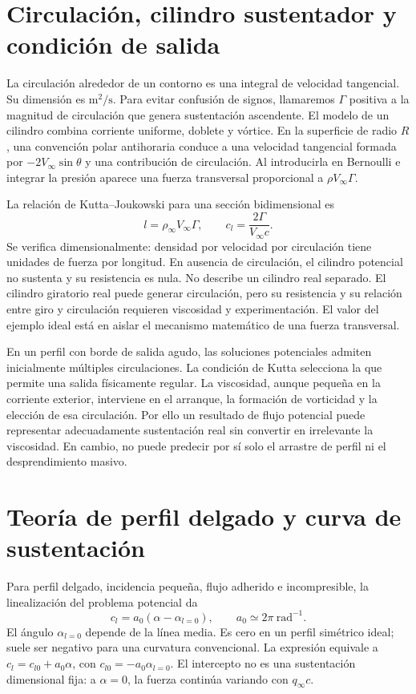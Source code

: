 \section{Circulación, cilindro sustentador y condición de salida}
La circulación alrededor de un contorno es una integral de velocidad tangencial. Su dimensión es $\mathrm{m^2/s}$. Para evitar confusión de signos, llamaremos $\Gamma$ positiva a la magnitud de circulación que genera sustentación ascendente. El modelo de un cilindro combina corriente uniforme, doblete y vórtice. En la superficie de radio $R$, una convención polar antihoraria conduce a una velocidad tangencial formada por $-2V_\infty\sin\theta$ y una contribución de circulación. Al introducirla en Bernoulli e integrar la presión aparece una fuerza transversal proporcional a $\rho V_\infty\Gamma$.

La relación de Kutta--Joukowski para una sección bidimensional es
\begin{equation}\label{eq:09-kj}
l=\rho_\infty V_\infty\Gamma,\qquad
c_l=\frac{2\Gamma}{V_\infty c}.
\end{equation}
Se verifica dimensionalmente: densidad por velocidad por circulación tiene unidades de fuerza por longitud. En ausencia de circulación, el cilindro potencial no sustenta y su resistencia es nula. No describe un cilindro real separado. El cilindro giratorio real puede generar circulación, pero su resistencia y su relación entre giro y circulación requieren viscosidad y experimentación. El valor del ejemplo ideal está en aislar el mecanismo matemático de una fuerza transversal.

En un perfil con borde de salida agudo, las soluciones potenciales admiten inicialmente múltiples circulaciones. La condición de Kutta selecciona la que permite una salida físicamente regular. La viscosidad, aunque pequeña en la corriente exterior, interviene en el arranque, la formación de vorticidad y la elección de esa circulación. Por ello un resultado de flujo potencial puede representar adecuadamente sustentación real sin convertir en irrelevante la viscosidad. En cambio, no puede predecir por sí solo el arrastre de perfil ni el desprendimiento masivo.

\section{Teoría de perfil delgado y curva de sustentación}
Para perfil delgado, incidencia pequeña, flujo adherido e incompresible, la linealización del problema potencial da
\begin{equation}\label{eq:09-cl}
c_l=a_0(\alpha-\alpha_{l=0}),\qquad a_0\simeq2\pi\ \mathrm{rad^{-1}}.
\end{equation}
El ángulo $\alpha_{l=0}$ depende de la línea media. Es cero en un perfil simétrico ideal; suele ser negativo para una curvatura convencional. La expresión equivale a $c_l=c_{l0}+a_0\alpha$, con $c_{l0}=-a_0\alpha_{l=0}$. El intercepto no es una sustentación dimensional fija: a $\alpha=0$, la fuerza continúa variando con $q_\infty c$.

